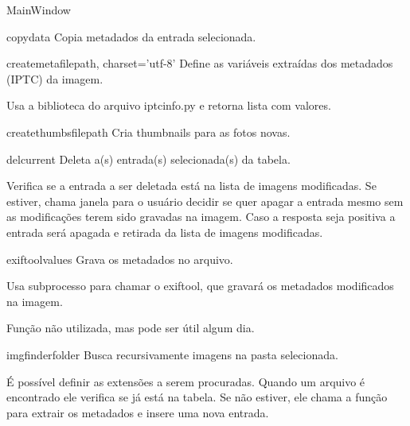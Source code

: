 \documentclass[letterpaper,10pt,portuguese]{manual}
\begin{document}
\begin{classdesc}{MainWindow}{}
\hypertarget{veliger.MainWindow.copydata}{}\begin{methoddesc}{copydata}{}
Copia metadados da entrada selecionada.
\end{methoddesc}

\hypertarget{veliger.MainWindow.createmeta}{}\begin{methoddesc}{createmeta}{filepath, charset='utf-8'}
Define as variáveis extraídas dos metadados (IPTC) da imagem.

Usa a biblioteca do arquivo iptcinfo.py e retorna lista com valores.
\end{methoddesc}

\hypertarget{veliger.MainWindow.createthumbs}{}\begin{methoddesc}{createthumbs}{filepath}
Cria thumbnails para as fotos novas.
\end{methoddesc}

\hypertarget{veliger.MainWindow.delcurrent}{}\begin{methoddesc}{delcurrent}{}
Deleta a(s) entrada(s) selecionada(s) da tabela.

Verifica se a entrada a ser deletada está na lista de imagens
modificadas. Se estiver, chama janela para o usuário decidir se quer
apagar a entrada mesmo sem as modificações terem sido gravadas na
imagem. Caso a resposta seja positiva a entrada será apagada e retirada
da lista de imagens modificadas.
\end{methoddesc}

\hypertarget{veliger.MainWindow.exiftool}{}\begin{methoddesc}{exiftool}{values}
Grava os metadados no arquivo.

Usa subprocesso para chamar o exiftool, que gravará os metadados
modificados na imagem.

Função não utilizada, mas pode ser útil algum dia.
\end{methoddesc}

\hypertarget{veliger.MainWindow.imgfinder}{}\begin{methoddesc}{imgfinder}{folder}
Busca recursivamente imagens na pasta selecionada.

É possível definir as extensões a serem procuradas. Quando um arquivo é
encontrado ele verifica se já está na tabela. Se não estiver, ele chama
a função para extrair os metadados e insere uma nova entrada.
\end{methoddesc}


\end{classdesc}
\end{document}
